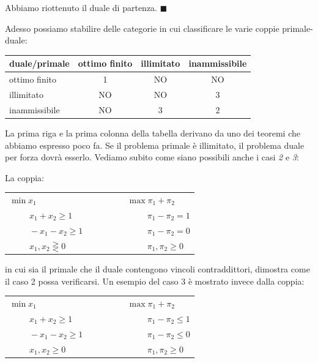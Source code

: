 \documentclass[11pt]{book}
\begin{document}
Abbiamo riottenuto il duale di partenza. $\blacksquare$
\vspace{11pt}

Adesso possiamo stabilire delle categorie in cui classificare le varie
coppie primale-duale:

\vspace{11pt}
\begin{center}
\begin{tabular}{|l|c|c|c|}
\hline
duale/primale & ottimo finito & illimitato & inammissibile \\ \hline
ottimo finito & 1 & NO & NO \\ \hline
illimitato & NO & NO & 3 \\ \hline
inammissibile & NO & 3 & 2 \\ \hline
\end{tabular}
\end{center}
\vspace{11pt}

La prima riga e la prima colonna della tabella derivano da uno dei
teoremi che abbiamo espresso poco fa.  Se il problema primale \`e
illimitato, il problema duale per forza dovr\`a esserlo.  Vediamo
subito come siano possibili anche i casi {\em 2} e {\em 3}:

La coppia:

\vspace{11pt}
\begin{center}
\begin{tabular}{lcl}
$\min x_1$ & $\phantom{aaaaaa}$ & $\max \pi_1 + \pi_2$\\
$\phantom{mina}x_1 + x_2 \geq 1$ && $\phantom{mina}\pi_1 - \pi_2 = 1$ \\
$\phantom{mina}-x_1 - x_2 \geq 1$ && $\phantom{mina}\pi_1 - \pi_2 = 0$\\  
$\phantom{mina}x_1, x_2 \gtreqless 0$ && $\phantom{mina}\pi_1, \pi_2 \geq 0$\\  
\end{tabular}
\end{center}
\vspace{11pt}

in cui sia il primale che il duale contengono vincoli contraddittori,
dimostra come il caso 2 possa verificarsi. Un esempio del caso 3 \`e
mostrato invece dalla coppia:

\vspace{11pt}
\begin{center}
\begin{tabular}{lcl}
$\min x_1$ & $\phantom{aaaaaa}$ & $\max \pi_1 + \pi_2$\\
$\phantom{mina}x_1 + x_2 \geq 1$ && $\phantom{mina}\pi_1 - \pi_2 \leq 1$ \\
$\phantom{mina}-x_1 - x_2 \geq 1$ && $\phantom{mina}\pi_1 - \pi_2 \leq 0$\\  
$\phantom{mina}x_1, x_2 \geq 0$ && $\phantom{mina}\pi_1, \pi_2 \geq 0$\\  
\end{tabular}
\end{center}
\vspace{11pt}
\end{document}
